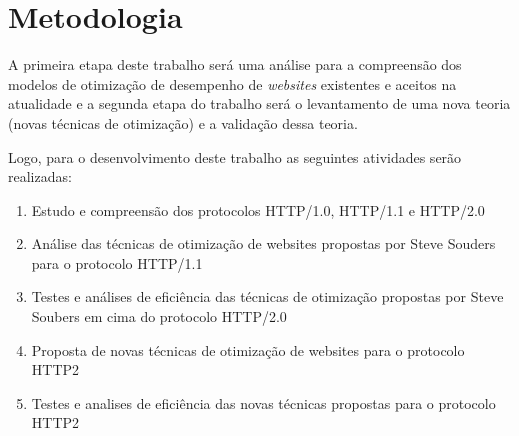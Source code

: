 %
%

\chapter{Metodologia}

A primeira etapa deste trabalho será uma análise para a compreensão dos modelos de otimização de desempenho de \textit{websites} existentes e aceitos na atualidade e a segunda etapa do trabalho será o levantamento de uma nova teoria (novas técnicas de otimização) e a validação dessa teoria.

Logo, para o desenvolvimento deste trabalho as seguintes atividades serão realizadas:
\begin{enumerate}
\item Estudo e compreensão dos protocolos HTTP/1.0, HTTP/1.1 e HTTP/2.0
\item Análise das técnicas de otimização de websites propostas por Steve Souders para o protocolo HTTP/1.1
\item Testes e análises de eficiência das técnicas de otimização propostas por Steve Soubers em cima do protocolo HTTP/2.0
\item Proposta de novas técnicas de otimização de websites para o protocolo HTTP2
\item Testes e analises de eficiência das novas técnicas propostas para o protocolo HTTP2
\end{enumerate}